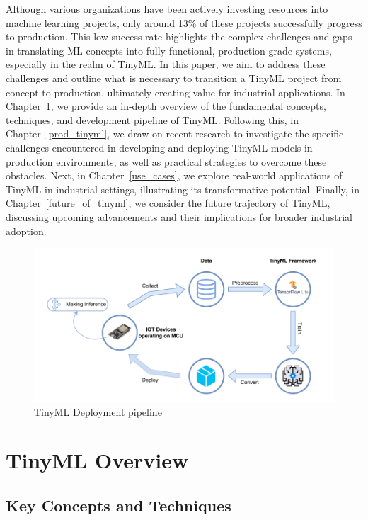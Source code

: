 \documentclass[twocolumn]{article}
\begin{document}
Although various organizations have been actively investing resources into machine learning projects, only around 13\% of these projects successfully progress to production. This low success rate highlights the complex challenges and gaps in translating ML concepts into fully functional, production-grade systems, especially in the realm of TinyML. In this paper, we aim to address these challenges and outline what is necessary to transition a TinyML project from concept to production, ultimately creating value for industrial applications. In Chapter~\ref{tinyml_overview}, we provide an in-depth overview of the fundamental concepts, techniques, and development pipeline of TinyML. Following this, in Chapter~\ref{prod_tinyml}, we draw on recent research to investigate the specific challenges encountered in developing and deploying TinyML models in production environments, as well as practical strategies to overcome these obstacles. Next, in Chapter~\ref{use_cases}, we explore real-world applications of TinyML in industrial settings, illustrating its transformative potential. Finally, in Chapter~\ref{future_of_tinyml}, we consider the future trajectory of TinyML, discussing upcoming advancements and their implications for broader industrial adoption.
\begin{figure}
	\centerline{
	\includegraphics[width=1\columnwidth]{resource/tinyml_deployment.pdf}
	}
	\caption{TinyML Deployment pipeline}
	\label{TUM}
\end{figure}

\section{TinyML Overview} 
\label{tinyml_overview}

\subsection{Key Concepts and Techniques}
\end{document}

